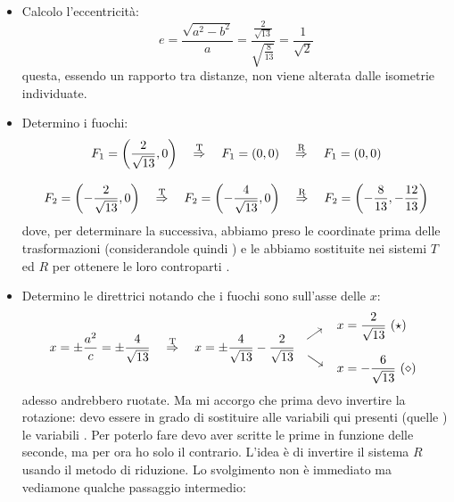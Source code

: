 \documentclass[a4paper, oneside]{article}
\begin{document}
			\begin{itemize}
				\item Calcolo l'eccentricità:
				\begin{equation*}
					e=\frac{\sqrt{a^2-b^2}}{a}=\frac{\displaystyle \frac{2}{\sqrt{13}} }{\displaystyle \sqrt{\frac{8}{13}} }= \frac{1}{\sqrt{2}}
				\end{equation*}
				questa, essendo un rapporto tra distanze, non viene alterata dalle isometrie individuate.
				\item Determino i fuochi:
				\begin{align*}
					\begin{array}{c}
						\displaystyle F_1=\left( \frac{2}{\sqrt{13}}, 0 \right) \quad \stackrel{\mathrm{T}}{\Rightarrow} \quad F_1=\left( 0 , 0 \right) \quad \stackrel{\mathrm{R}}{\Rightarrow} \quad F_1=\left( 0 , 0 \right)
						\\
						\\
						\displaystyle F_2=\left(\displaystyle -\frac{2}{\sqrt{13}}, 0 \right) \quad \stackrel{\mathrm{T}}{\Rightarrow} \quad F_2=\left( -\frac{4}{\sqrt{13}}, 0 \right) \quad \stackrel{\mathrm{R}}{\Rightarrow} \quad F_2=\left( -\frac{8}{13}, -\frac{12}{13} \right)
					\end{array}
				\end{align*}
				dove, per determinare la  successiva, abbiamo preso le coordinate prima delle trasformazioni (considerandole quindi ) e le abbiamo sostituite nei sistemi $T$ ed $R$ per ottenere le loro controparti .
				\item Determino le direttrici notando che i fuochi sono sull'asse delle $x$:
				\begin{align*}
					x=\pm \frac{a^2}{c} = \pm \frac{4}{\sqrt{13}} \quad \stackrel{\mathrm{T}}{\allora} \quad x=\pm \frac{4}{\sqrt{13}} - \frac{2}{\sqrt{13}} \ 
					\begin{array}{c}
						\rotatebox{35}{$\longrightarrow$} \\
						\rotatebox{-35}{$\longrightarrow$}
					\end{array} 
					\begin{array}{l}
						\displaystyle x=\frac{2}{\sqrt{13}} \ (\star)\\ \\
						\displaystyle x=-\frac{6}{\sqrt{13}} \ (\diamond)
					\end{array}
				\end{align*}
				adesso andrebbero ruotate. Ma mi accorgo che prima devo invertire la rotazione: devo essere in grado di sostituire alle variabili qui presenti (quelle ) le variabili . Per poterlo fare devo aver scritte le prime in funzione delle seconde, ma per ora ho solo il contrario. L'idea è di invertire il sistema $R$ usando il metodo di riduzione. Lo svolgimento non è immediato ma vediamone qualche passaggio intermedio:

\end{itemize}
\end{document}
